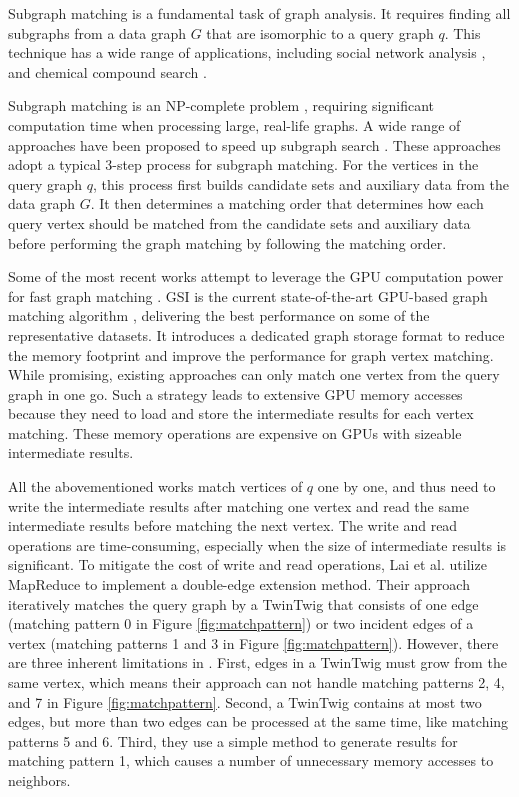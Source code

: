 Subgraph matching is a fundamental task of graph analysis. It requires finding all subgraphs from a data graph $G$ that are isomorphic to a
query graph $q$. This technique has a wide range of applications, including social network analysis \cite{wang2012truss,kairam2012The}, and chemical compound
search \cite{wooyoung2011Biological}.

Subgraph matching is an NP-complete problem \cite{garey1979Computers}, requiring significant computation time when processing large, real-life
graphs. A wide range of approaches have been proposed to speed up subgraph search
\cite{bhattarai2019ceci,guo2020gpu,tran2015fast,shi2020graphpi,bi2016efficient,zeng2020gsi,sun2020subgraph,guo2020exploiting,sun2020rapidmatch,lin2016network}.
These approaches adopt a typical 3-step process for subgraph matching. For the vertices in the query graph $q$, this process first builds
candidate sets and auxiliary data from the data graph $G$. It then determines a matching order that determines how each query vertex
should be matched from the candidate sets and auxiliary data before performing the graph matching by following the matching order.

Some of the most recent works attempt to leverage the GPU computation power for fast graph matching
\cite{lin2016network,guo2020gpu,tran2015fast,zeng2020gsi,guo2020exploiting}. GSI is the current state-of-the-art GPU-based graph matching
algorithm \cite{zeng2020gsi}, delivering the best performance on some of the representative datasets. It introduces a dedicated graph
storage format to reduce the memory footprint and improve the performance for graph vertex matching. While promising, existing approaches
can only match one vertex from the query graph in one go. Such a strategy leads to extensive GPU memory accesses because they need to load
and store the intermediate results for each vertex matching. These memory operations are expensive on GPUs with sizeable intermediate
results.



All the abovementioned works match vertices of $q$ one by one, and thus need to write the intermediate results after matching one vertex
and read the same intermediate results before matching the next vertex. The write and read operations are time-consuming, especially when
the size of intermediate results is significant. To mitigate the cost of write and read operations, Lai et al. \cite{lai2015scalable}
utilize MapReduce to implement a double-edge extension method. Their approach iteratively matches the query graph by a TwinTwig that
consists of one edge (matching pattern 0 in Figure \ref{fig:matchpattern}) or two incident edges of a vertex (matching patterns 1 and 3 in
Figure \ref{fig:matchpattern}). However, there are three inherent limitations in \cite{lai2015scalable}. First, edges in a TwinTwig must
grow from the same vertex, which means their approach can not handle matching patterns 2, 4, and 7 in Figure \ref{fig:matchpattern}.
Second, a TwinTwig contains at most two edges, but more than two edges can be processed at the same time, like matching patterns 5 and 6.
Third, they use a simple method to generate results for matching pattern 1, which causes a number of unnecessary memory accesses to
neighbors.

